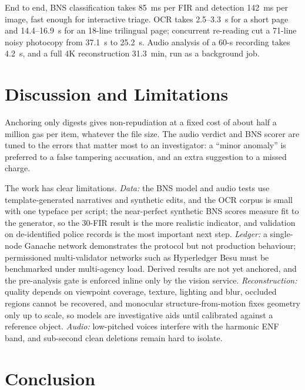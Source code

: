 \documentclass[conference]{IEEEtran}
\begin{document}
End to end, BNS classification takes 85~ms per FIR and detection 142~ms per image, fast enough for interactive triage. OCR takes 2.5--3.3~s for a short page and 14.4--16.9~s for an 18-line trilingual page; concurrent re-reading cut a 71-line noisy photocopy from 37.1~s to 25.2~s. Audio analysis of a 60-s recording takes 4.2~s, and a full 4K reconstruction 31.3~min, run as a background job.

\section{Discussion and Limitations}
\label{sec:discussion}

Anchoring only digests gives non-repudiation at a fixed cost of about half a million gas per item, whatever the file size. The audio verdict and BNS scorer are tuned to the errors that matter most to an investigator: a ``minor anomaly'' is preferred to a false tampering accusation, and an extra suggestion to a missed charge.

The work has clear limitations. \textit{Data:} the BNS model and audio tests use template-generated narratives and synthetic edits, and the OCR corpus is small with one typeface per script; the near-perfect synthetic BNS scores measure fit to the generator, so the 30-FIR result is the more realistic indicator, and validation on de-identified police records is the most important next step. \textit{Ledger:} a single-node Ganache network demonstrates the protocol but not production behaviour; permissioned multi-validator networks such as Hyperledger Besu must be benchmarked under multi-agency load. Derived results are not yet anchored, and the pre-analysis gate is enforced inline only by the vision service. \textit{Reconstruction:} quality depends on viewpoint coverage, texture, lighting and blur, occluded regions cannot be recovered, and monocular structure-from-motion fixes geometry only up to scale, so models are investigative aids until calibrated against a reference object. \textit{Audio:} low-pitched voices interfere with the harmonic ENF band, and sub-second clean deletions remain hard to isolate.

\section{Conclusion}
\end{document}
